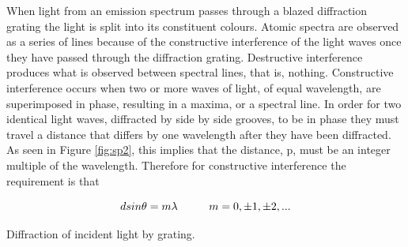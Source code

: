 When light from an emission spectrum passes through a blazed diffraction grating the light is split into its constituent colours. Atomic spectra are observed as a series of lines because of the constructive interference of the light waves once they have passed through the diffraction grating. Destructive interference produces what is observed between spectral lines, that is, nothing. Constructive interference occurs when two or more waves of light, of equal wavelength, are superimposed in phase, resulting in a maxima, or a spectral line. In order for two identical light waves, diffracted by side by side grooves, to be in phase they must travel a distance that differs by one wavelength after they have been diffracted. As seen in Figure \ref{fig:sp2}, this implies that the distance, p, must be an integer multiple of the wavelength. Therefore for constructive interference the requirement is that

\begin{equation}
dsin\theta=m\lambda\hspace{10mm}m=0,\pm1,\pm2,...
\label{equ:sp1}
\end{equation}

\begin{marginfigure}
\caption{Diffraction of incident light by grating.}
\label{fig:sp2}
\end{marginfigure}

